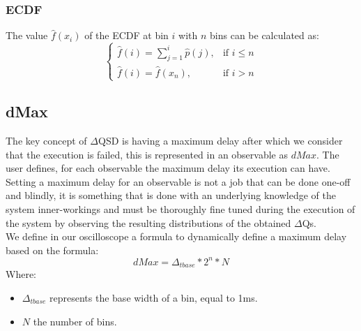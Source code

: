     \subsubsection{ECDF}
    The value $\hat{f}(x_i)$ of the ECDF at bin $i$ with $n$ bins can be calculated as:
    \begin{equation}
        \begin{cases}
            \hat{f}(i) = \sum_{j=1}^{i} \hat{p}(j), & \text{if } i \le n \\  
            \hat{f}(i) = \hat{f}(x_n), & \text{if } i > n 
        \end{cases}
        \label{eq:cdf}
    \end{equation}
    
    \subsection{dMax}
        The key concept of $\Delta$QSD is having a maximum delay after which we consider that the execution is failed, this is represented in an observable as $dMax$. The user defines, for each observable the maximum delay its execution can have. \\ 
Setting a maximum delay for an observable is not a job that can be done one-off and blindly, it is something that is done with an underlying knowledge of the system inner-workings and must be thoroughly fine tuned during the execution of the system by observing the resulting distributions of the obtained $\Delta$Qs. \\

We define in our oscilloscope a formula to dynamically define a maximum delay based on the formula:
\begin{equation}
    dMax = \Delta_{t base} * 2^n * N  
    \label{eq:dMax}
\end{equation}
Where:
\begin{itemize}
    \item $\Delta_{t base}$ represents the base width of a bin, equal to 1ms.
    \item $N$ the number of bins.
\end{itemize}

